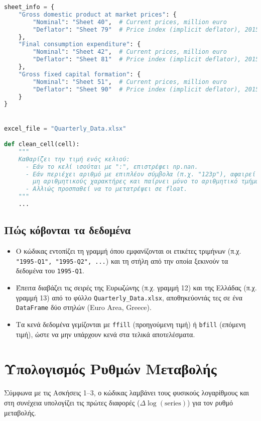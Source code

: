 \documentclass{book}
\begin{document}
\begin{tcolorbox}[colback=white,colframe=black,title=Απόσπασμα Κώδικα: Φύλλα Καθαρισμός Κελιών]
\begin{lstlisting}[language=Python]
  sheet_info = {
    "Gross domestic product at market prices": {
        "Nominal": "Sheet 40",  # Current prices, million euro
        "Deflator": "Sheet 79"  # Price index (implicit deflator), 2015=100, euro
    },
    "Final consumption expenditure": {
        "Nominal": "Sheet 42",  # Current prices, million euro
        "Deflator": "Sheet 81"  # Price index (implicit deflator), 2015=100, euro
    },
    "Gross fixed capital formation": {
        "Nominal": "Sheet 51",  # Current prices, million euro
        "Deflator": "Sheet 90"  # Price index (implicit deflator), 2015=100, euro
    }
}


excel_file = "Quarterly_Data.xlsx"

def clean_cell(cell):
    """
    Καθαρίζει την τιμή ενός κελιού:
      - Εάν το κελί ισούται με ":", επιστρέφει np.nan.
      - Εάν περιέχει αριθμό με επιπλέον σύμβολα (π.χ. "123p"), αφαιρεί
        μη αριθμητικούς χαρακτήρες και παίρνει μόνο το αριθμητικό τμήμα.
      - Αλλιώς προσπαθεί να το μετατρέψει σε float.
    """
    ...
\end{lstlisting}
\end{tcolorbox}

\subsection*{Πώς κόβονται τα δεδομένα}
\begin{itemize}
  \item Ο κώδικας εντοπίζει τη γραμμή όπου εμφανίζονται οι ετικέτες τριμήνων (π.χ. \texttt{"1995-Q1", "1995-Q2", ...}) και τη στήλη από την οποία ξεκινούν τα δεδομένα του \texttt{1995-Q1}.
  \item Έπειτα διαβάζει τις σειρές της Ευρωζώνης (π.χ. γραμμή 12) και της Ελλάδας (π.χ. γραμμή 13) από το φύλλο \texttt{Quarterly\_Data.xlsx}, αποθηκεύοντάς τες σε ένα \texttt{DataFrame} δύο στηλών (Euro Area, Greece).
  \item Τα κενά δεδομένα γεμίζονται με \texttt{ffill} (προηγούμενη τιμή) ή \texttt{bfill} (επόμενη τιμή), ώστε να μην υπάρχουν κενά στα τελικά αποτελέσματα.
\end{itemize}

\section{Υπολογισμός Ρυθμών Μεταβολής}
Σύμφωνα με τις Ασκήσεις 1--3, ο κώδικας λαμβάνει τους φυσικούς λογαρίθμους και στη συνέχεια υπολογίζει τις πρώτες διαφορές (\(\Delta \log(\text{series})\)) για τον ρυθμό μεταβολής.
\end{document}
